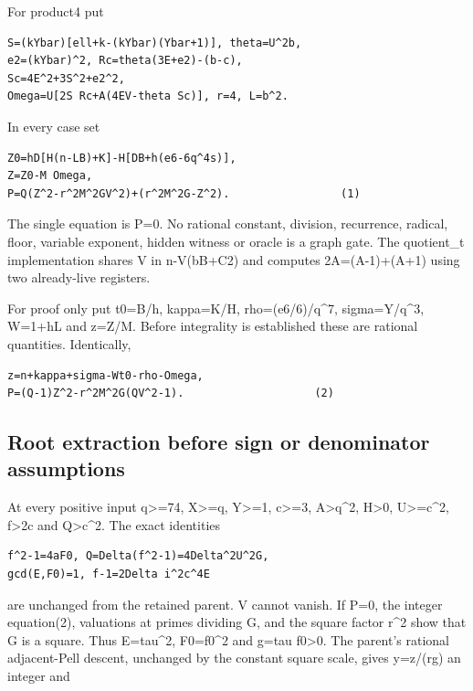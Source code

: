 For product4 put

\begin{verbatim}
S=(kYbar)[ell+k-(kYbar)(Ybar+1)], theta=U^2b,
e2=(kYbar)^2, Rc=theta(3E+e2)-(b-c),
Sc=4E^2+3S^2+e2^2,
Omega=U[2S Rc+A(4EV-theta Sc)], r=4, L=b^2.
\end{verbatim}

In every case set

\begin{verbatim}
Z0=hD[H(n-LB)+K]-H[DB+h(e6-6q^4s)],
Z=Z0-M Omega,
P=Q(Z^2-r^2M^2GV^2)+(r^2M^2G-Z^2).                 (1)
\end{verbatim}

The single equation is P=0. No rational constant, division, recurrence,
radical, floor, variable exponent, hidden witness or oracle is a graph
gate. The quotient\_t implementation shares V in n-V(bB+C2) and computes
2A=(A-1)+(A+1) using two already-live registers.

For proof only put t0=B/h, kappa=K/H, rho=(e6/6)/q\^{}7, sigma=Y/q\^{}3,
W=1+hL and z=Z/M. Before integrality is established these are rational
quantities. Identically,

\begin{verbatim}
z=n+kappa+sigma-Wt0-rho-Omega,
P=(Q-1)Z^2-r^2M^2G(QV^2-1).                    (2)
\end{verbatim}

\subsection{Root extraction before sign or denominator
assumptions}\label{root-extraction-before-sign-or-denominator-assumptions}

At every positive input q\textgreater=74, X\textgreater=q,
Y\textgreater=1, c\textgreater=3, A\textgreater q\^{}2, H\textgreater0,
U\textgreater=c\^{}2, f\textgreater2c and Q\textgreater c\^{}2. The
exact identities

\begin{verbatim}
f^2-1=4aF0, Q=Delta(f^2-1)=4Delta^2U^2G,
gcd(E,F0)=1, f-1=2Delta i^2c^4E
\end{verbatim}

are unchanged from the retained parent. V cannot vanish. If P=0, the
integer equation(2), valuations at primes dividing G, and the square
factor r\^{}2 show that G is a square. Thus E=tau\^{}2, F0=f0\^{}2 and
g=tau f0\textgreater0. The parent's rational adjacent-Pell descent,
unchanged by the constant square scale, gives y=\textbar z\textbar/(rg)
an integer and

